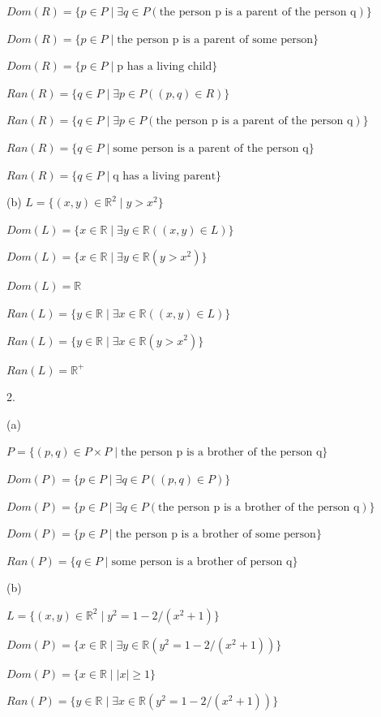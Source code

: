 \documentclass{article}
\newcommand{\vs}{\vspace{30pt}}
\begin{document}
$Dom(R) = \{p \in P \mid \exists q \in P (\text{the person p is a parent of the person q})\}$

$Dom(R) = \{p \in P \mid \text{the person p is a parent of some person}\}$

$Dom(R) = \{p \in P \mid \text{p has a living child}\}$

$Ran(R) = \{q \in P \mid \exists p \in P ((p, q) \in R)\}$

$Ran(R) = \{q \in P \mid \exists p \in P (\text{the person p is a parent of the person q})\}$

$Ran(R) = \{q \in P \mid \text{some person is a parent of the person q}\}$

$Ran(R) = \{q \in P \mid \text{q has a living parent}\}$

(b) $L = \{(x, y) \in \mathbb{R}^2 \mid y > x^2\}$

$Dom(L) = \{x \in \mathbb{R} \mid \exists y \in \mathbb{R} ((x,y) \in L)\}$

$Dom(L) = \{x \in \mathbb{R} \mid \exists y \in \mathbb{R} (y > x^2)\}$

$Dom(L) = \mathbb{R}$

$Ran(L) = \{y \in \mathbb{R} \mid \exists x \in \mathbb{R} ((x,y) \in L)\}$

$Ran(L) = \{y \in \mathbb{R} \mid \exists x \in \mathbb{R} (y > x^2)\}$

$Ran(L) = \mathbb{R}^+$

2.

(a)

$P = \{(p,q) \in P \times P \mid \text{the person p is a brother of the person q}\}$

$Dom(P) = \{p \in P \mid \exists q \in P ((p, q) \in P)\}$

$Dom(P) = \{p \in P \mid \exists q \in P (\text{the person p is a brother of the person q})\}$

$Dom(P) = \{p \in P \mid \text{the person p is a brother of some person}\}$

$Ran(P) = \{q \in P \mid \text{some person is a brother of person q}\}$
\vs

(b)

$L = \{(x, y) \in \mathbb{R}^2 \mid y^2 = 1 - 2/(x^2 + 1)\}$

$Dom(P) = \{x \in \mathbb{R} \mid \exists y \in \mathbb{R} (y^2 = 1 - 2/(x^2 + 1))\}$

$Dom(P) = \{x \in \mathbb{R} \mid |x| \geq 1\}$

$Ran(P) = \{y \in \mathbb{R} \mid \exists x \in \mathbb{R} (y^2 = 1 - 2/(x^2 + 1))\}$
\end{document}
